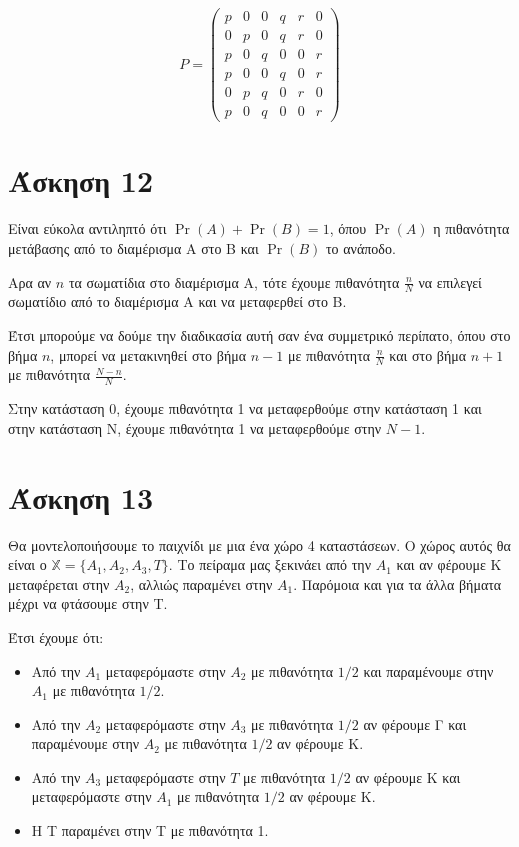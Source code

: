 \documentclass[11pt,a4paper]{article}
\begin{document}
\begin{equation*}
    P = 
    \begin{pmatrix}
        p & 0 & 0 & q & r & 0 \\
        0 & p & 0 & q & r & 0 \\
        p & 0 & q & 0 & 0 & r \\
        p & 0 & 0 & q & 0 & r \\
        0 & p & q & 0 & r & 0 \\
        p & 0 & q & 0 & 0 & r
    \end{pmatrix}
\end{equation*}

\section*{Άσκηση 12}
Είναι εύκολα αντιληπτό ότι $\Pr(A) + \Pr(B) = 1$, όπου $\Pr(A)$ η πιθανότητα μετάβασης από το διαμέρισμα Α στο Β και $\Pr(B)$ το ανάποδο.

Αρα αν $n$ τα σωματίδια στο διαμέρισμα Α, τότε έχουμε πιθανότητα $\frac{n}{N}$ να επιλεγεί σωματίδιο από το διαμέρισμα Α και να μεταφερθεί στο Β. 

Έτσι μπορούμε να δούμε την διαδικασία αυτή σαν ένα συμμετρικό περίπατο, όπου στο βήμα $n$, μπορεί να μετακινηθεί στο βήμα $n-1$ με πιθανότητα $\frac{n}{N}$ και στο βήμα $n+1$ με πιθανότητα $\frac{N-n}{N}$. 

Στην κατάσταση 0, έχουμε πιθανότητα 1 να μεταφερθούμε στην κατάσταση 1 και στην κατάσταση Ν, έχουμε πιθανότητα 1 να μεταφερθούμε στην $N-1$.

\section*{Άσκηση 13}

Θα μοντελοποιήσουμε το παιχνίδι με μια ένα χώρο 4 καταστάσεων. Ο χώρος αυτός θα είναι ο $\mathbb{X} = \{A_1, A_2, A_3, T\}$. Το πείραμα μας ξεκινάει από την $A_1$ και αν φέρουμε Κ μεταφέρεται στην $A_2$, αλλιώς παραμένει στην $A_1$. Παρόμοια και για τα άλλα βήματα μέχρι να φτάσουμε στην Τ.

Έτσι έχουμε ότι:
\begin{itemize}
    \item Από την $A_1$ μεταφερόμαστε στην $A_2$ με πιθανότητα $1/2$ και παραμένουμε στην $A_1$ με πιθανότητα $1/2$.
    \item Από την $A_2$ μεταφερόμαστε στην $A_3$ με πιθανότητα $1/2$ αν φέρουμε Γ και παραμένουμε στην $A_2$ με πιθανότητα $1/2$ αν φέρουμε Κ.
    \item  Από την $A_3$ μεταφερόμαστε στην $T$ με πιθανότητα $1/2$ αν φέρουμε Κ και μεταφερόμαστε στην $A_1$ με πιθανότητα $1/2$ αν φέρουμε Κ.
    \item Η Τ παραμένει στην Τ με πιθανότητα 1.
\end{itemize}
\end{document}
